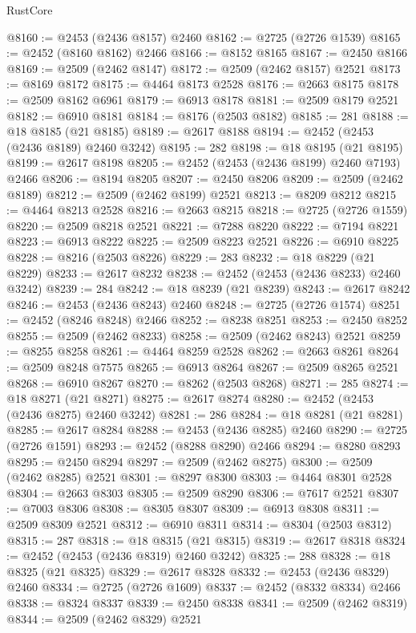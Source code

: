 \begin{lexlean}{RustCore}
\begin{coremodule}
@8160 := @2453 (@2436 @8157) @2460
@8162 := @2725 (@2726 @1539)
@8165 := @2452 (@8160 @8162) @2466
@8166 := @8152 @8165
@8167 := @2450 @8166
@8169 := @2509 (@2462 @8147)
@8172 := @2509 (@2462 @8157) @2521
@8173 := @8169 @8172
@8175 := @4464 @8173 @2528
@8176 := @2663 @8175
@8178 := @2509 @8162 @6961
@8179 := @6913 @8178
@8181 := @2509 @8179 @2521
@8182 := @6910 @8181
@8184 := @8176 (@2503 @8182)
@8185 := 281
@8188 := @18 @8185 (@21 @8185)
@8189 := @2617 @8188
@8194 := @2452 (@2453 (@2436 @8189) @2460 @3242)
@8195 := 282
@8198 := @18 @8195 (@21 @8195)
@8199 := @2617 @8198
@8205 := @2452 (@2453 (@2436 @8199) @2460 @7193) @2466
@8206 := @8194 @8205
@8207 := @2450 @8206
@8209 := @2509 (@2462 @8189)
@8212 := @2509 (@2462 @8199) @2521
@8213 := @8209 @8212
@8215 := @4464 @8213 @2528
@8216 := @2663 @8215
@8218 := @2725 (@2726 @1559)
@8220 := @2509 @8218 @2521
@8221 := @7288 @8220
@8222 := @7194 @8221
@8223 := @6913 @8222
@8225 := @2509 @8223 @2521
@8226 := @6910 @8225
@8228 := @8216 (@2503 @8226)
@8229 := 283
@8232 := @18 @8229 (@21 @8229)
@8233 := @2617 @8232
@8238 := @2452 (@2453 (@2436 @8233) @2460 @3242)
@8239 := 284
@8242 := @18 @8239 (@21 @8239)
@8243 := @2617 @8242
@8246 := @2453 (@2436 @8243) @2460
@8248 := @2725 (@2726 @1574)
@8251 := @2452 (@8246 @8248) @2466
@8252 := @8238 @8251
@8253 := @2450 @8252
@8255 := @2509 (@2462 @8233)
@8258 := @2509 (@2462 @8243) @2521
@8259 := @8255 @8258
@8261 := @4464 @8259 @2528
@8262 := @2663 @8261
@8264 := @2509 @8248 @7575
@8265 := @6913 @8264
@8267 := @2509 @8265 @2521
@8268 := @6910 @8267
@8270 := @8262 (@2503 @8268)
@8271 := 285
@8274 := @18 @8271 (@21 @8271)
@8275 := @2617 @8274
@8280 := @2452 (@2453 (@2436 @8275) @2460 @3242)
@8281 := 286
@8284 := @18 @8281 (@21 @8281)
@8285 := @2617 @8284
@8288 := @2453 (@2436 @8285) @2460
@8290 := @2725 (@2726 @1591)
@8293 := @2452 (@8288 @8290) @2466
@8294 := @8280 @8293
@8295 := @2450 @8294
@8297 := @2509 (@2462 @8275)
@8300 := @2509 (@2462 @8285) @2521
@8301 := @8297 @8300
@8303 := @4464 @8301 @2528
@8304 := @2663 @8303
@8305 := @2509 @8290
@8306 := @7617 @2521
@8307 := @7003 @8306
@8308 := @8305 @8307
@8309 := @6913 @8308
@8311 := @2509 @8309 @2521
@8312 := @6910 @8311
@8314 := @8304 (@2503 @8312)
@8315 := 287
@8318 := @18 @8315 (@21 @8315)
@8319 := @2617 @8318
@8324 := @2452 (@2453 (@2436 @8319) @2460 @3242)
@8325 := 288
@8328 := @18 @8325 (@21 @8325)
@8329 := @2617 @8328
@8332 := @2453 (@2436 @8329) @2460
@8334 := @2725 (@2726 @1609)
@8337 := @2452 (@8332 @8334) @2466
@8338 := @8324 @8337
@8339 := @2450 @8338
@8341 := @2509 (@2462 @8319)
@8344 := @2509 (@2462 @8329) @2521

\end{coremodule}
\end{lexlean}
